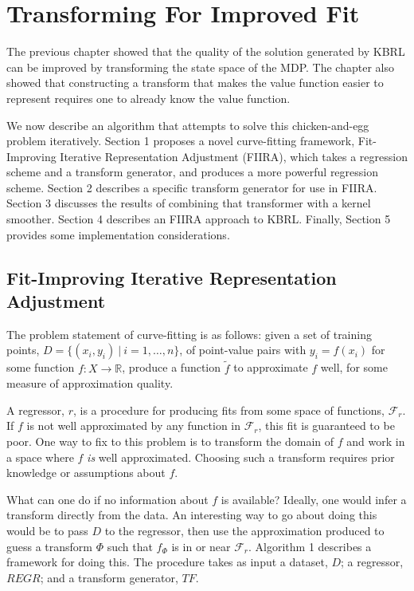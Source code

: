 \chapter{Transforming For Improved Fit}
The previous chapter showed that the quality of the solution generated by KBRL
can be improved by transforming the state space of the MDP.
The chapter also showed that constructing a transform that makes the value
function easier to represent requires one to already know the value function.

We now describe an algorithm that attempts to solve this chicken-and-egg
problem iteratively. Section 1 proposes a novel curve-fitting framework,
Fit-Improving Iterative Representation Adjustment (FIIRA),
which takes a regression scheme and a transform generator, and produces a
more powerful regression scheme.
Section 2 describes a specific transform generator for use in FIIRA.
Section 3 discusses the results of combining that transformer with a kernel
smoother.
Section 4 describes an FIIRA approach to KBRL.
Finally, Section 5 provides some implementation considerations.

\section{Fit-Improving Iterative Representation Adjustment}
The problem statement of curve-fitting is as follows: given a set of training
points, $D = \{(x_i,y_i)\ |\ i = 1, \ldots, n\}$, of point-value pairs with
$y_i = f(x_i)$ for some function $f : X \to \mathbb{R}$,
produce a function $\tilde f$ to approximate $f$ well, for some measure of
approximation quality.

A regressor, $r$, is a procedure for producing fits from some space of
functions, $\mathcal{F}_r$.
If $f$ is not well approximated by any function in $\mathcal{F}_r$,
this fit is guaranteed to be poor.
One way to fix to this problem is to transform the domain of $f$ and work in a
space where $f$ \textit{is} well approximated. Choosing such a transform
requires prior knowledge or assumptions about $f$.

What can one do if no information about $f$ is available?
Ideally, one would infer a transform directly from the data.
An interesting way to go about doing this would be to pass $D$ to the
regressor,
then use the approximation produced to guess a transform $\Phi$ such that
$f_\Phi$ is in or near $\mathcal{F}_r$.
Algorithm 1 describes a framework for doing this.
The procedure takes as input a dataset, $D$; a regressor, $REGR$;
and a transform generator, $TF$.

